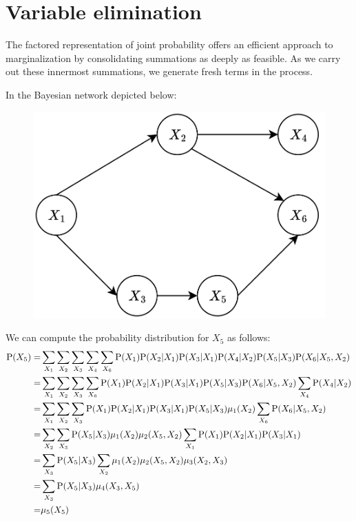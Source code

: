 \section{Variable elimination}

The factored representation of joint probability offers an efficient approach to marginalization by consolidating summations as deeply as feasible.
As we carry out these innermost summations, we generate fresh terms in the process.
\begin{example}
    In the Bayesian network depicted below:
    \begin{figure}[H]
        \centering
        \includegraphics[width=0.25\linewidth]{images/bn.png}
    \end{figure}
    We can compute the probability distribution for $X_5$ as follows:
    \begin{align*}
        \textnormal{P}(X_5)     =& \sum_{X_1}\sum_{X_2}\sum_{X_3}\sum_{X_4}\sum_{X_6}\textnormal{P}(X_1)\textnormal{P}(X_2|X_1)\textnormal{P}(X_3|X_1)\textnormal{P}(X_4|X_2)\textnormal{P}(X_5|X_3)\textnormal{P}(X_6|X_5,X_2)          \\
                                =& \sum_{X_1}\sum_{X_2}\sum_{X_3}\sum_{X_6}\textnormal{P}(X_1)\textnormal{P}(X_2|X_1)\textnormal{P}(X_3|X_1)\textnormal{P}(X_5|X_3)\textnormal{P}(X_6|X_5,X_2)\sum_{X_4}\textnormal{P}(X_4|X_2)          \\ 
                                =& \sum_{X_1}\sum_{X_2}\sum_{X_3}\textnormal{P}(X_1)\textnormal{P}(X_2|X_1)\textnormal{P}(X_3|X_1)\textnormal{P}(X_5|X_3)\mu_1(X_2)\sum_{X_6}\textnormal{P}(X_6|X_5,X_2)\\
                                =& \sum_{X_2}\sum_{X_3}\textnormal{P}(X_5|X_3)\mu_1(X_2)\mu_2(X_5,X_2)\sum_{X_1}\textnormal{P}(X_1)\textnormal{P}(X_2|X_1)\textnormal{P}(X_3|X_1)     \\
                                =& \sum_{X_3}\textnormal{P}(X_5|X_3)\sum_{X_2}\mu_1(X_2)\mu_2(X_5,X_2)\mu_3(X_2,X_3)\\
                                =& \sum_{X_3}\textnormal{P}(X_5|X_3)\mu_4(X_3,X_5)\\
                                =& \mu_5(X_5)
    \end{align*}
\end{example}

